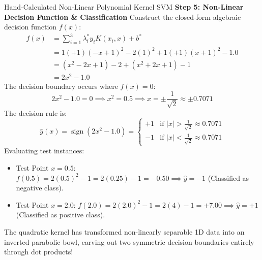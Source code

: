 \begin{examplebox}[breakable]{Hand-Calculated Non-Linear Polynomial Kernel SVM}
\textbf{Step 5: Non-Linear Decision Function \& Classification}
Construct the closed-form algebraic decision function $f(x)$:
\begin{align}
f(x) &= \sum_{i=1}^3 \lambda_i^* y_i K(x_i, x) + b^* \nonumber \\
&= 1(+1)(-x + 1)^2 - 2(1)^2 + 1(+1)(x + 1)^2 - 1.0 \nonumber \\
&= (x^2 - 2x + 1) - 2 + (x^2 + 2x + 1) - 1 \nonumber \\
&= 2x^2 - 1.0
\end{align}
The decision boundary occurs where $f(x) = 0$:
\begin{equation}
2x^2 - 1.0 = 0 \implies x^2 = 0.5 \implies x = \pm \frac{1}{\sqrt{2}} \approx \pm 0.7071
\end{equation}
The decision rule is:
\begin{equation}
\hat{y}(x) = \operatorname{sign}(2x^2 - 1.0) = \begin{cases} +1 & \text{if } |x| > \frac{1}{\sqrt{2}} \approx 0.7071 \\ -1 & \text{if } |x| < \frac{1}{\sqrt{2}} \approx 0.7071 \end{cases}
\end{equation}
Evaluating test instances:
\begin{itemize}
    \item Test Point $x = 0.5$: $f(0.5) = 2(0.5)^2 - 1 = 2(0.25) - 1 = -0.50 \implies \hat{y} = -1$ (Classified as negative class).
    \item Test Point $x = 2.0$: $f(2.0) = 2(2.0)^2 - 1 = 2(4) - 1 = +7.00 \implies \hat{y} = +1$ (Classified as positive class).
\end{itemize}
The quadratic kernel has transformed non-linearly separable 1D data into an inverted parabolic bowl, carving out two symmetric decision boundaries entirely through dot products!
\end{examplebox}

